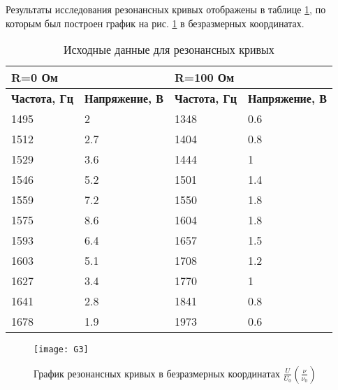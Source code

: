 \documentclass[a4paper]{article}
\begin{document}
Результаты исследования резонансных кривых отображены в таблице \ref{tabb}, по которым был построен график на рис. \ref{fig:graph} в безразмерных координатах.
\begin{table}[]
	\centering
	\begin{tabular}{|l|l|l|l|}
		\hline
		\multicolumn{2}{|l|}{\textbf{R=0 Ом}}         & \multicolumn{2}{l|}{\textbf{R=100 Ом}}        \\ \hline
		\textbf{Частота, Гц} & \textbf{Напряжение, В} & \textbf{Частота, Гц} & \textbf{Напряжение, В} \\ \hline
		1495                 & 2                      & 1348                 & 0.6                    \\ \hline
		1512                 & 2.7                    & 1404                 & 0.8                    \\ \hline
		1529                 & 3.6                    & 1444                 & 1                      \\ \hline
		1546                 & 5.2                    & 1501                 & 1.4                    \\ \hline
		1559                 & 7.2                    & 1550                 & 1.8                    \\ \hline
		1575                 & 8.6                    & 1604                 & 1.8                    \\ \hline
		1593                 & 6.4                    & 1657                 & 1.5                    \\ \hline
		1603                 & 5.1                    & 1708                 & 1.2                    \\ \hline
		1627                 & 3.4                    & 1770                 & 1                      \\ \hline
		1641                 & 2.8                    & 1841                 & 0.8                    \\ \hline
		1678                 & 1.9                    & 1973                 & 0.6                    \\ \hline
	\end{tabular}
	\caption{Исходные данные для резонансных кривых}
	\label{tabb}
\end{table}
\begin{figure}[bth]
	\centering
	\texttt{[image: G3]}
	\caption{График резонансных кривых в безразмерных координатах $\frac{U}{U_0}(\frac{\nu}{\nu_0})$}
	\label{fig:graph}
\end{figure}
\end{document}
